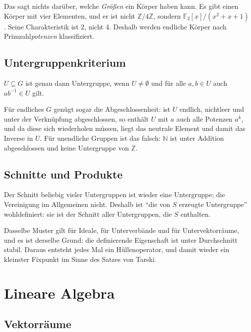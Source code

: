 \documentclass[12pt, a4paper]{article}
\begin{document}
\begin{notebox}
Das sagt nichts darüber, welche \emph{Größen} ein Körper haben kann. Es gibt
einen Körper mit vier Elementen, und er ist nicht $\mathbb{Z}/4\mathbb{Z}$,
sondern $\mathbb{F}_2[x]/(x^2+x+1)$. Seine Charakteristik ist 2, nicht 4.
Deshalb werden endliche Körper nach Primzahl\emph{potenzen} klassifiziert.
\end{notebox}

\subsection{Untergruppenkriterium}

\begin{definitionbox}
$U \subseteq G$ ist genau dann Untergruppe, wenn $U \neq \emptyset$ und
für alle $a, b \in U$ auch $ab^{-1} \in U$ gilt.
\end{definitionbox}

Für endliches $G$ genügt sogar die Abgeschlossenheit: ist $U$ endlich,
nichtleer und unter der Verknüpfung abgeschlossen, so enthält $U$ mit $a$
auch alle Potenzen $a^k$, und da diese sich wiederholen müssen, liegt das
neutrale Element und damit das Inverse in $U$. Für unendliche Gruppen ist das
falsch: $\mathbb{N}$ ist unter Addition abgeschlossen und keine Untergruppe
von $\mathbb{Z}$.

\subsection{Schnitte und Produkte}

Der Schnitt beliebig vieler Untergruppen ist wieder eine Untergruppe; die
Vereinigung im Allgemeinen nicht. Deshalb ist "`die von $S$ erzeugte
Untergruppe"' wohldefiniert: sie ist der Schnitt aller Untergruppen, die $S$
enthalten.

Dasselbe Muster gilt für Ideale, für Unterverbände und für Untervektorräume,
und es ist derselbe Grund: die definierende Eigenschaft ist unter Durchschnitt
stabil. Daraus entsteht jedes Mal ein Hüllenoperator, und damit wieder ein
kleinster Fixpunkt im Sinne des Satzes von Tarski.

\section{Lineare Algebra}

\subsection{Vektorräume}
\end{document}
